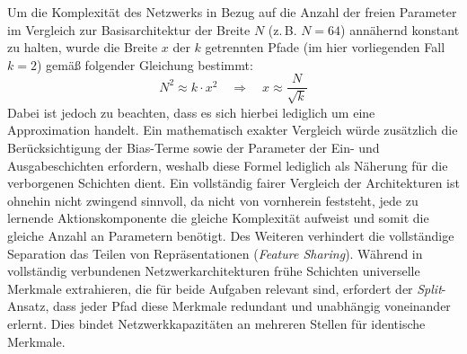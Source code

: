 Um die Komplexität des Netzwerks in Bezug auf die Anzahl der freien Parameter im Vergleich zur Basisarchitektur der Breite $N$ (z.\,B. $N=64$) annähernd konstant zu halten, wurde die Breite $x$ der $k$ getrennten Pfade (im hier vorliegenden Fall $k=2$) gemäß folgender Gleichung bestimmt:
\begin{equation}
    N^2 \approx k \cdot x^2 \quad \Longrightarrow \quad x \approx \frac{N}{\sqrt{k}}
    \label{eq:complexity_approx}
\end{equation}
Dabei ist jedoch zu beachten, dass es sich hierbei lediglich um eine Approximation handelt. Ein mathematisch exakter Vergleich würde zusätzlich die Berücksichtigung der Bias-Terme sowie der Parameter der Ein- und Ausgabeschichten erfordern, weshalb diese Formel lediglich als Näherung für die verborgenen Schichten dient. Ein vollständig fairer Vergleich der Architekturen ist ohnehin nicht zwingend sinnvoll, da nicht von vornherein feststeht, jede zu lernende Aktionskomponente die gleiche Komplexität aufweist und somit die gleiche Anzahl an Parametern benötigt.
Des Weiteren verhindert die vollständige Separation das Teilen von Repräsentationen (\textit{Feature Sharing}). Während in vollständig verbundenen Netzwerkarchitekturen frühe Schichten universelle Merkmale extrahieren, die für beide Aufgaben relevant sind, erfordert der \textit{Split}\hyp{}Ansatz, dass jeder Pfad diese Merkmale redundant und unabhängig voneinander erlernt. Dies bindet Netzwerkkapazitäten an mehreren Stellen für identische Merkmale.
\medskip

